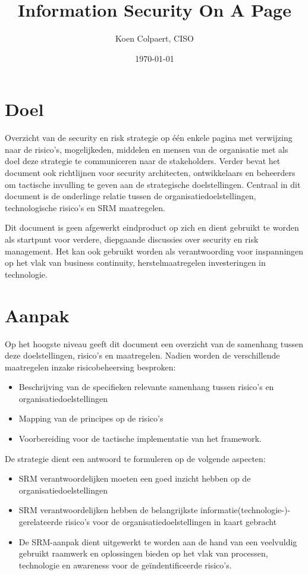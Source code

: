 \documentclass[11pt]{article}
\author{Koen Colpaert, CISO}
\date{\today}
\title{Information Security On A Page}
\begin{document}
\maketitle
\tableofcontents


\section{Doel}
\label{sec:orgb522e1e}
Overzicht van de security en risk strategie op één enkele pagina met verwijzing naar de risico's, mogelijkeden, middelen en mensen van de organisatie met als doel deze strategie te communiceren 
naar de stakeholders. Verder bevat het document ook richtlijnen voor security architecten, ontwikkelaars en beheerders om tactische invulling te geven aan de strategische doelstellingen.
Centraal in dit document is de onderlinge relatie tussen de organisatiedoelstellingen, technologische risico's en SRM maatregelen.

Dit document is geen afgewerkt eindproduct op zich en dient gebruikt te worden als startpunt voor verdere, diepgaande discussies over security en risk management. Het kan ook gebruikt worden als
verantwoording voor inspanningen op het vlak van business continuity, herstelmaatregelen investeringen in technologie.

\section{Aanpak}
\label{sec:orgc76991b}
Op het hoogste niveau geeft dit document een overzicht van de samenhang tussen deze doelstellingen, risico's en maatregelen. Nadien worden de verschillende maatregelen inzake risicobeheersing besproken:
\begin{itemize}
\item Beschrijving van de specifieken relevante samenhang tussen risico's en organisatiedoelstellingen
\item Mapping van de principes op de risico's
\item Voorbereiding voor de tactische implementatie van het framework.
\end{itemize}

De strategie dient een antwoord te formuleren op de volgende aspecten:
\begin{itemize}
\item SRM verantwoordelijken moeten een goed inzicht hebben op de organisatiedoelstellingen
\item SRM verantwoordelijken hebben de belangrijkste informatie(technologie-)-gerelateerde risico's voor de organisatiedoelstellingen in kaart gebracht
\item De SRM-aanpak dient uitgewerkt te worden aan de hand van een veelvuldig gebruikt raamwerk en oplossingen bieden op het vlak van processen, technologie en awareness voor de geïndentificeerde risico's.
\end{itemize}
\end{document}
